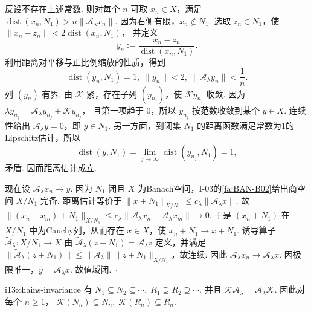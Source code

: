 \begin{FAProof}
反设不存在上述常数. 则对每个 \(\displaystyle n\) 可取 \(\displaystyle x_n\in X\)，满足
\(\displaystyle \operatorname{dist}(x_n,N_1) > n\|\mathcal A_\lambda x_n\|\).
因为右侧有限，\(\displaystyle x_n\notin N_1\). 选取 \(\displaystyle z_n\in N_1\)，使
\(\displaystyle \|x_n-z_n\| < 2\operatorname{dist}(x_n,N_1)\)，
并定义
\[
y_n
:=
\frac{x_n-z_n}{\operatorname{dist}(x_n,N_1)}.
\]
利用距离对平移与正比例缩放的性质，得到
\[
\operatorname{dist}(y_n,N_1)=1, \; \|y_n\|<2, \; \|\mathcal A_\lambda y_n\|<\frac{1}{n}.
\]
列 \(\displaystyle (y_n)\) 有界. 由 \(\displaystyle \mathcal K\) 紧，存在子列 \(\displaystyle (y_{n_j})\)，使 \(\displaystyle \mathcal Ky_{n_j}\) 收敛. 因为
\(\displaystyle \lambda y_{n_j} = \mathcal A_\lambda y_{n_j}+\mathcal Ky_{n_j}\)，
且第一项趋于 \(\displaystyle0\)，所以 \(\displaystyle y_{n_j}\) 按范数收敛到某个 \(\displaystyle y\in X\). 连续性给出 \(\displaystyle \mathcal A_\lambda y=0\)，即 \(\displaystyle y\in N_1\). 另一方面，到闭集 \(\displaystyle N_1\) 的距离函数满足常数为1的Lipschitz估计，所以
\[
\operatorname{dist}(y,N_1)
=
\lim_{j\to\infty}\operatorname{dist}(y_{n_j},N_1)
=1,
\]
矛盾. 因而距离估计成立.

现在设 \(\displaystyle \mathcal A_\lambda x_n\to y\). 因为 \(\displaystyle N_1\) 闭且 \(\displaystyle X\) 为Banach空间，I-03的\autoref{fa:BAN-B02}给出商空间 \(\displaystyle X/N_1\) 完备. 距离估计等价于
\(\displaystyle \|x+N_1\|_{X/N_1} \leqslant c_\lambda\|\mathcal A_\lambda x\|\).
故
\(\displaystyle \|(x_n-x_m)+N_1\|_{X/N_1} \leqslant c_\lambda\|\mathcal A_\lambda x_n-\mathcal A_\lambda x_m\| \to0\).
于是 \(\displaystyle (x_n+N_1)\) 在 \(\displaystyle X/N_1\) 中为Cauchy列，从而存在 \(\displaystyle x\in X\)，使 \(\displaystyle x_n+N_1\to x+N_1\). 诱导算子 \(\displaystyle \widetilde{\mathcal A}_\lambda:X/N_1\to X\) 由 \(\displaystyle \widetilde{\mathcal A}_\lambda(z+N_1)=\mathcal A_\lambda z\) 定义，并满足 \(\displaystyle \|\widetilde{\mathcal A}_\lambda(z+N_1)\|\leqslant\|\mathcal A_\lambda\|\|z+N_1\|_{X/N_1}\)，故连续. 因此 \(\displaystyle \mathcal A_\lambda x_n\to\mathcal A_\lambda x\). 因极限唯一，\(\displaystyle y=\mathcal A_\lambda x\). 故值域闭.
\hfill\(\square\)
\end{FAProof}

\begin{FALemma}[C][核链、值域链与不变性]{i13:chains-invariance}
有
\(\displaystyle N_1\subseteq N_2\subseteq\cdots, \; R_1\supseteq R_2\supseteq\cdots\).
并且 \(\displaystyle \mathcal K\mathcal A_\lambda=\mathcal A_\lambda\mathcal K\). 因此对每个 \(\displaystyle n\geqslant1\)，
\(\displaystyle \mathcal K(N_n)\subseteq N_n, \; \mathcal K(R_n)\subseteq R_n\).
\end{FALemma}

